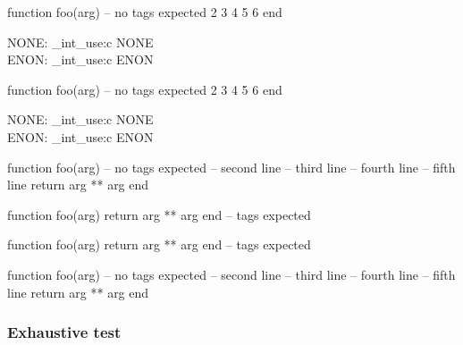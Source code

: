 \begin{CDRBlock}[
  stepnumber=1,
  firstnumber = last,
]
function foo(arg) -- no tags expected
  2
  3
  4
  5
  6
end
\end{CDRBlock}

\ExplSyntaxOn
NONE: \CDR_int_use:c { NONE } \\
ENON: \CDR_int_use:c { ENON } \\
\ExplSyntaxOff

\begin{CDRBlock}[
  stepnumber=1,
  firstnumber = auto,
]
function foo(arg) -- no tags expected
  2
  3
  4
  5
  6
end
\end{CDRBlock}
\ExplSyntaxOn
NONE: \CDR_int_use:c { NONE } \\
ENON: \CDR_int_use:c { ENON } \\
\ExplSyntaxOff

\begin{CDRBlock}[
  pygments,
  lang=lua,
  numbers=none,
  debug,
  show tags=none,
  only top=false,
]
function foo(arg) -- no tags expected
  -- second line
  -- third line
  -- fourth line
  -- fifth line
  return arg ** arg
end
\end{CDRBlock}


\begin{CDRBlock}[
  fontfamily=menlo,
  fontsize=\large,
  pygments=true,
  lang=lua,
  numbers=left,
  debug=true,
  show tags,
  only top=false
]
function foo(arg) return arg ** arg end -- tags expected
\end{CDRBlock}
\begin{CDRBlock}[
  tags={whatever it isp,we are the champions},
  fontfamily=menlo,
  fontsize=\large,
  pygments=true,
  lang=lua,
  numbers=left,
  debug=true,
  show tags,
  only top
]
function foo(arg) return arg ** arg end -- tags expected
\end{CDRBlock}
\begin{CDRBlock}[
  pygments,
  lang=lua,
  numbers=none,
  debug,
  showspaces,
  show tags=none,
  only top=false,
]
function foo(arg) -- no tags expected
  -- second line
  -- third line
  -- fourth line
  -- fifth line
  return arg ** arg
end
\end{CDRBlock}

\egroup

\subsubsection{Exhaustive test}

